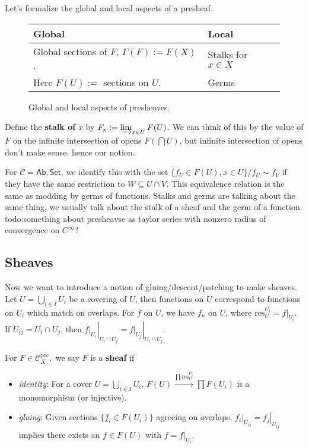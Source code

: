 Let's formalize the global and local aspects of a presheaf.
\begin{figure}[H]
    \centering
    \begin{tabular}{l|l} 
        \textbf{Global}  & \textbf{Local}  \\ \hline
        Global sections of $F$, $\Gamma (F):= F(X)$. & Stalks for $x \in X$ \\
        Here $F(U):=$ sections on $U$. & Germs 
    \end{tabular}
    \label{global_local} 
    \caption{Global and local aspects of presheaves.} 
\end{figure}
\begin{definition}[]
    Define the \textbf{stalk of} $x$ by $F_x := \varinjlim _{x \in U} F(U)$. We can think of this by the value of $F$ on the infinite intersection of opens $F\left( \bigcap U \right)  $, but infinite intersection of opens don't make sense, hence our notion. 
\end{definition} For $\mathcal{C} =\mathsf{Ab} , \mathsf{Set} $, we identify this with the set $\{f_U \in F(U), x\in U\} / f_U \sim f_V $ if they have the same restriction to $W \subseteq  U \cap V$. This equivalence relation is the same as modding by germs of functions. Stalks and germs are talking about the same thing, we usually talk about the stalk of a sheaf and the germ of a function. {\color{red}todo:something about presheavse as taylor series with nonzero radius of convergence on $C^{\infty}$?} 

\subsection{Sheaves}

Now we want to introduce a notion of gluing/descent/patching to make sheaves. Let $U = \bigcup_{i \in  I} U_i $ be a covering of $U$, then functions on $U$ correspond to functions on $U _i $ which match on overlaps. For $f $ on $U$, we have  $f _n $ on $U$, where $\mathrm{res}_U ^{U_i }= \left. f \right| _{U_i }$. If $U_{ij}=U_i  \cap U_j $, then $\left. \left. f \right| _{U_i }   \right| _{U_i  \cap U_j}= \left. \left. f \right| _{U_j } \right| _{U_i  \cap U_j }$.

\begin{definition}
For $F \in \mathcal{C} _X ^{\mathrm{pre}},$ we say $F$ is a \textbf{sheaf} if 
\begin{itemize}
\setlength\itemsep{-.2em}
    \item \emph{identity}: For a cover $U = \bigcup_{i \in  I} U_i $, $F(U)\xrightarrow{\prod \mathrm{res}_{U}^{U_i }}\prod F(U_i ) $ is a monomorphism (or injective).
    \item \emph{gluing}: Given sections $\{f _i  \in F(U_i )\} $ agreeing on overlaps, $\left. f_i  \right| _{U_{ij}} =\left. f_j  \right| _{U_{ij}}$ implies there exists an $f \in F(U)$ with $f=\left. f \right| _{U_i }$.
\end{itemize}
\end{definition}

